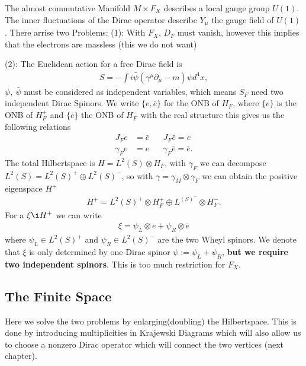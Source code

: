 \documentclass[a4paper]{article}
\theoremstyle{definition}
\theoremstyle{definition}
\theoremstyle{definition}
\theoremstyle{theorem}
\theoremstyle{theorem}
\theoremstyle{theorem}
\begin{document}
The almost commutative Manifold $M\times F_X$ describes a local gauge group
$U(1)$. The inner fluctuations of the Dirac operator describe $Y_\mu$ the
gauge field of $U(1)$. There arrise two Problems:
\newline
(1): With $F_X$, $D_F$ must vanish, however this implies that the electrons
are massless (this we do not want)
\newline

(2): The Euclidean action for a free Dirac field is
\begin{align}
    S = - \int i \bar{\psi}(\gamma ^\mu\partial _\mu - m) \psi d^4x,
\end{align}
$\psi,\ \bar{\psi}$ must be considered as independent variables, which means
$S_F$ need two independent Dirac Spinors. We write $\{e, \bar{e}\}$ for the
ONB of $H_F$, where $\{e\}$ is the ONB of $H_F^+$ and $\{\bar{e}\}$ the ONB
of $H_F^-$ with the real structure this gives us the following relations
\begin{align}
    J_F e &= \bar{e} \;\;\;\;\;\; J_F \bar{e} = e \\
    \gamma_F e &= e  \;\;\;\;\;\;   \gamma_F \bar{e} = \bar{e}.
\end{align}
The total Hilbertspace is $H = L^2(S) \otimes H_F$, with $\gamma _F$ we can
decompose $L^2(S) = L^2(S)^+ \oplus L^2(S)^-$, so with $\gamma = \gamma _M
\otimes \gamma _F$ we can obtain the positive eigenspace $H^+$
\begin{align}
    H^+ = L^2(S)^+ \otimes H_F^+ \oplus L^(S)^- \otimes H_F^-.
\end{align}
For a $\xi \i H^+$ we can write
\begin{align}
    \xi = \psi _L \otimes e + \psi _R \otimes \bar{e}
\end{align}
where $\psi _L \in L^2(S)^+$ and $\psi _R \in L^2(S)^-$ are the two Wheyl
spinors. We denote that $\xi$ is only determined by one Dirac spinor $\psi :=
\psi_L + \psi _R$, \textbf{but we require two independent spinors}. This is
too much restriction for $F_X$.
\subsection{The Finite Space}
Here we solve the two problems by enlarging(doubling) the Hilbertspace. This
is done by introducing multiplicities in Krajewski Diagrams which will also
allow us to choose a nonzero Dirac operator which will connect the two
vertices (next chapter).
\newline
\end{document}
